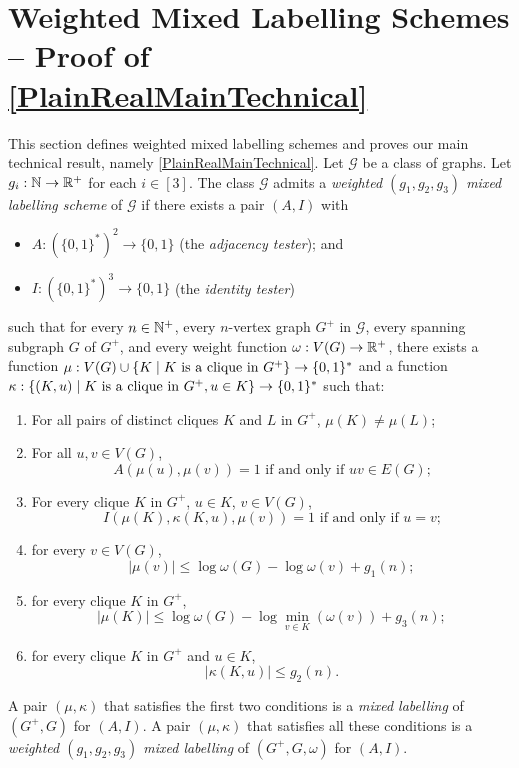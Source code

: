 \documentclass{patmorin}
\renewcommand{\le}{\leqslant}
\renewcommand{\leq}{\leqslant}
\newcommand{\defin}[1]{\emph{\textcolor{brightmaroon}{#1}}}
\DeclarePairedDelimiter{\set}{\{}{\}}
\begin{document}
\section{Weighted Mixed Labelling Schemes -- Proof of \texorpdfstring{\cref{PlainRealMainTechnical}}{Theorem \ref*{PlainRealMainTechnical}}}
\label{weighted_mixed_section}
 
This section defines weighted mixed labelling schemes and proves our main technical result, namely \cref{PlainRealMainTechnical}. Let $\mathcal{G}$ be a class of graphs.
Let $g_i:\mathbb{N}\to\mathbb{R}^+$ for each $i\in[3]$.
The class  $\mathcal{G}$ admits a \defin{weighted $(g_1,g_2,g_3)$ mixed labelling scheme} of $\mathcal{G}$ if there exists a pair $(A,I)$ with
\begin{itemize}[nosep,nolistsep]
  \item $A:(\{0,1\}^*)^2\to\{0,1\}$ (the \defin{adjacency tester}); and
  \item $I:(\{0,1\}^*)^3\to\{0,1\}$ (the \defin{identity tester})
\end{itemize}
such that for every $n\in\mathbb{N}^+$, every $n$-vertex graph $G^+$ in $\mathcal{G}$, every spanning subgraph $G$ of $G^+$, and every weight function $\omega:V(G)\to \mathbb{R}^+$, there exists a function $\mu: V(G)\cup \{K\mid \text{$K$ is a clique in $G^+$}\} \to \set{0,1}^*$ and a function $\kappa:\{(K, u)\mid \text{$K$ is a clique in $G^+$}, u\in K\}\to \set{0,1}^*$ such that:
\begin{enumerate}[nosep,nolistsep,label=(\roman*)]
  \item For all pairs of distinct cliques $K$ and $L$ in $G^+$, $\mu(K)\neq\mu(L)$;
  \item For all $u,v\in V(G)$,
        \[
          \textrm{$A(\mu(u),\mu(v))=1$ if and only if $uv\in E(G)$;}
        \]
  \item For every clique $K$ in $G^+$, $u\in K$, $v\in V(G)$,
        \[
          \textrm{$I(\mu(K),\kappa(K, u),\mu(v))=1$ if and only if $u=v$;}
        \]
  \item for every $v\in V(G)$,
        \[
          |\mu(v)| \leq \log \omega(G) - \log\omega(v) + g_1(n);
        \]
  \item for every clique $K$ in $G^+$,
        \[
          |\mu(K)|\le \log \omega(G) - \log\min_{v\in K}(\omega(v)) + g_3(n);
        \]
  \item  for every clique $K$ in $G^+$ and $u\in K$,
        \[
          |\kappa(K, u)| \leq g_2(n).
        \]
\end{enumerate}
A pair $(\mu,\kappa)$ that satisfies the first two conditions is a \defin{mixed labelling} of $(G^+,G)$ for $(A,I)$.  A pair $(\mu,\kappa)$ that satisfies all these conditions is a \defin{weighted $(g_1,g_2,g_3)$ mixed labelling} of $(G^+,G,\omega)$ for $(A,I)$.
\end{document}
